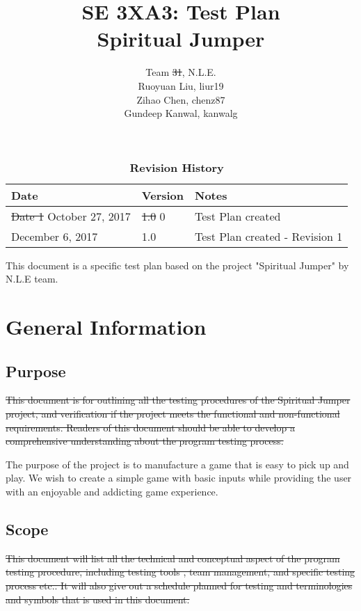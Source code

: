 \documentclass[12pt, titlepage]{article}
\title{SE 3XA3: Test Plan\\Spiritual Jumper}
\author{Team \rev{25} \sout{31}, N.L.E.
		\\ Ruoyuan Liu, liur19
		\\ Zihao Chen, chenz87
		\\ Gundeep Kanwal, kanwalg
}
\date{\rev{December 6, 2017}}
\newcommand{\rev}[1]{\textcolor{RevisionColour}{#1}}
\begin{document}
\maketitle

\tableofcontents
\listoftables
\listoffigures

\begin{table}[bp]
\caption{\bf Revision History}
\begin{tabularx}{\textwidth}{p{3cm}p{2cm}X}
\toprule {\bf Date} & {\bf Version} & {\bf Notes}\\
\midrule
\sout{Date 1} \rev{October 27, 2017} & \sout{1.0} \rev{0} & Test Plan created\\
\rev{December 6, 2017} & \rev{1.0} & \rev{Test Plan created - Revision 1}\\
\bottomrule
\end{tabularx}
\end{table}

\newpage


This document is a specific test plan based on the project "Spiritual Jumper" by N.L.E team.

\section{General Information}

\subsection{Purpose}
\sout{This document is for outlining all the testing procedures of the Spiritual Jumper project, and verification if the project meets the functional and non-functional requirements. Readers of this document should be able to develop a comprehensive understanding about the program testing process.}

\rev{The purpose of the project is to manufacture a game that is easy to pick up and play. We wish to create a simple game with basic inputs while providing the user with an enjoyable and addicting game experience.}

\subsection{Scope}

\sout{This document will list all the technical and conceptual aspect of the program testing procedure, including testing tools , team management, and specific testing process etc.. It will also give out a schedule planned for testing and terminologies and symbols that is used in this document.}
\end{document}
